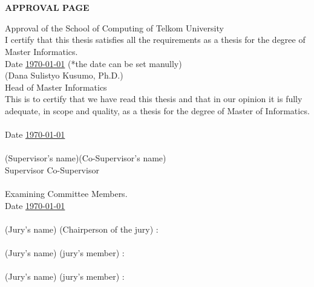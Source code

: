 \chapter*{}
\vspace*{-0.5cm}
\begin{center}
	\normalfont\LARGE\textbf{APPROVAL PAGE}
\end{center}
\onehalfspacing
Approval of the School of Computing of Telkom University \\
I certify that this thesis satisfies all the requirements as a thesis for the degree of Master Informatics.\\ 
Date \underline{\mydate \today} (*the date can be set manully)
\vfill
\underline{\hspace*{6cm}}\\
(Dana Sulistyo Kusumo, Ph.D.) \\
Head of Master Informatics\\ 
This is to certify that we have read this thesis and that in our opinion it is fully adequate, in scope and quality, as a thesis for the degree of Master of Informatics.\\\\
Date \underline{\mydate \today}\\
\vfill
\underline{\hspace*{6cm}} \hfill \underline{\hspace*{6cm}}\\
(Supervisor's name)\hfill                                            (Co-Supervisor's name)\\ 
Supervisor   \hfill                                              Co-Supervisor \\\\
Examining Committee Members.\\
Date \underline{\mydate \today}\\
\\
(Jury's name) (Chairperson of the jury) \hfill :\underline{\hspace*{6cm}} \\\\
(Jury's name) (jury’s member)  \hfill :\underline{\hspace*{6cm}} \\\\
(Jury's name) (jury’s member) \hfill :\underline{\hspace*{6cm}} \\\\
